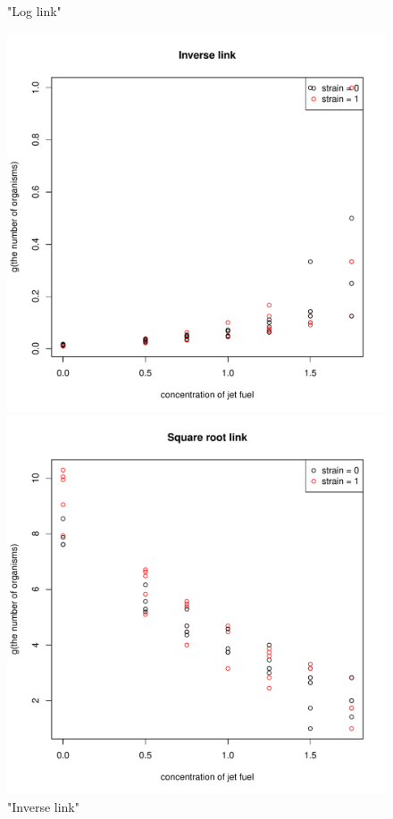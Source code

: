 \documentclass[]{article}
\begin{document}
\begin{enumerate}
{\begin{figure}
		\caption{"Log link"}
		\label{Log}
	\endminipage\hfill
		\includegraphics[width = \textwidth]{pic/HW2_4/Inverse_link}
		\caption{"Inverse link"}
		\label{Inv}
	\endminipage\hfill
		\includegraphics[width = \textwidth]{pic/HW2_4/Square_root_link}

\end{figure}}
\end{enumerate}
\end{document}

